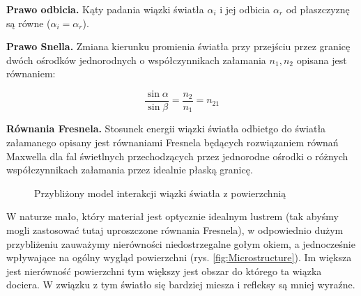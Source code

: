 \documentclass[../main.tex]{subfiles}
\begin{document}
\textbf{Prawo odbicia.}
  Kąty padania wiązki światła $\alpha_i$ i jej odbicia $\alpha_r$ od
  płaszczyznę są równe ($\alpha_i = \alpha_r$).

\textbf{Prawo Snella.}
  Zmiana kierunku promienia światła przy przejściu przez granicę dwóch ośrodków
  jednorodnych o współczynnikach załamania $n_1, n_2$ opisana jest równaniem:

  \begin{displaymath}
    \frac{\sin\alpha}{\sin\beta} =
      \frac{n_2}{n_1} = n_{21}
  \end{displaymath}

\textbf{Równania Fresnela.}
  Stosunek energii wiązki światła odbietgo do światła załamanego opisany jest
  równaniami Fresnela będących rozwiązaniem równań Maxwella dla fal świetlnych
  przechodzących przez jednorodne ośrodki o różnych współczynnikach załamania
  przez idealnie płaską granicę.

\begin{figure}[h]
  \centering
  \caption{Przybliżony model interakcji wiązki światła z powierzchnią}
  \label{fig:ReflectionRefraction}
\end{figure}

W naturze mało, który materiał jest optycznie idealnym lustrem (tak abyśmy
mogli zastosować tutaj uproszczone równania Fresnela), w odpowiednio dużym
przybliżeniu zauważymy nierówności niedostrzegalne gołym okiem, a jednocześnie
wpływające na ogólny wygląd powierzchni (rys. \ref{fig:Microstructure}). Im
większa jest nierówność powierzchni tym większy jest obszar do którego ta
wiązka dociera. W związku z tym światło się bardziej miesza i refleksy są mniej
wyraźne.
\end{document}
